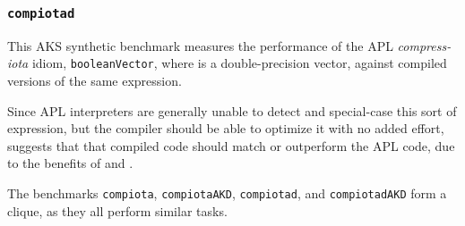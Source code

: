 \subsubsection{\tt compiotad}
\label{benchmarkcompiotad}

This AKS synthetic benchmark measures the performance of the
APL {\em compress-iota} idiom, {\tt booleanVector\qslash\0\qomega},
where {\tt \qomega} is a double-precision vector,
against compiled versions of the same expression.

Since APL interpreters are generally unable to
detect and special-case this sort of expression, but the \sac compiler 
should be able to optimize it with no added effort, suggests that
that compiled \sac code should match or outperform the APL code,
due to the benefits of \wlf and \awlf.

The benchmarks {\tt compiota}, {\tt compiotaAKD}, {\tt compiotad}, and
{\tt compiotadAKD} form a clique, as they
all perform similar tasks.
